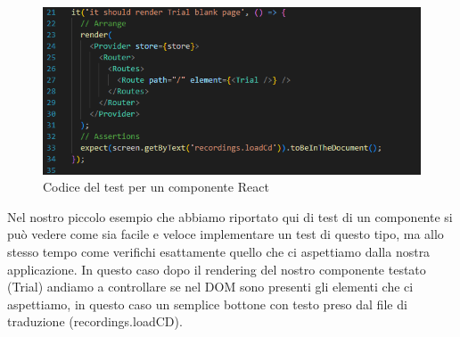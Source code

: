 \begin{figure}[H]
  \centering
  \includegraphics[width=\textwidth]{immagini/test-trial.png}
  \caption{Codice del test per un componente React}
\end{figure}

Nel nostro piccolo esempio che abbiamo riportato qui di test di un componente si può vedere come sia facile e veloce implementare un test di questo tipo, ma allo stesso tempo come
verifichi esattamente quello che ci aspettiamo dalla nostra applicazione. In questo caso dopo il rendering del nostro componente testato (Trial) andiamo a controllare
se nel DOM sono presenti gli elementi che ci aspettiamo, in questo caso un semplice bottone con testo preso dal file di traduzione (recordings.loadCD).

